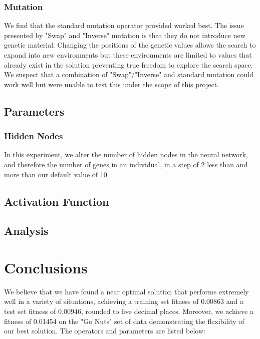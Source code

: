 \documentclass[sigconf]{acmart}
\begin{document}
\subsubsection{Mutation}
We find that the standard mutation operator provided worked best. The issue presented by "Swap" and "Inverse" mutation is that they do not introduce new genetic material. Changing the positions of the genetic values allows the search to expand into new environments but these environments are limited to values that already exist in the solution preventing true freedom to explore the search space. We suspect that a combination of "Swap"/"Inverse" and standard mutation could work well but were unable to test this under the scope of this project.

\subsection{Parameters}
\subsubsection{Hidden Nodes}
In this experiment, we alter the number of hidden nodes in the neural network, and therefore the number of genes in an individual, in a step of 2 less than and more than our default value of 10.

\subsection{Activation Function}


\begin{center}



\end{center}

\subsection{Analysis}

\section{Conclusions}
We believe that we have found a near optimal solution that performs extremely well in a variety of situations, achieving a training set fitness of 0.00863 and a test set fitness of 0.00946, rounded to five decimal places. Moreover, we achieve a fitness of 0.01454 on the "Go Nuts" set of data demonstrating the flexibility of our best solution. The operators and parameters are listed below:
\end{document}
